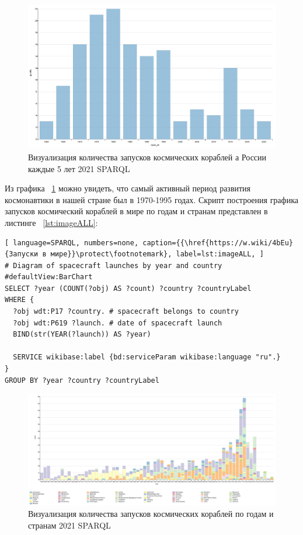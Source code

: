 \begin{figure}[h!]
  \includegraphics[width=\linewidth]{graphics/chapter/spacecraft_space_station/ImgRU.png}
  \caption[График Россия]{Визуализация количества запусков космических кораблей а России каждые 5 лет 2021 SPARQL}%
  \label{fig:ImageRU5}%
\end{figure}

Из графика ~\ref{fig:ImageRU5} можно увидеть, что самый активный период развития космонавтики в нашей стране был в 1970-1995 годах.
Скрипт построения графика запусков космический кораблей в мире по годам и странам представлен в листинге ~\ref{lst:imageALL}:
\begin{lstlisting}[ language=SPARQL, numbers=none, caption={{\href{https://w.wiki/4bEu}{Запуски в мире}}\protect\footnotemark}, label=lst:imageALL, ]
# Diagram of spacecraft launches by year and country
#defaultView:BarChart
SELECT ?year (COUNT(?obj) AS ?count) ?country ?countryLabel
WHERE {
  ?obj wdt:P17 ?country. # spacecraft belongs to country 
  ?obj wdt:P619 ?launch. # date of spacecraft launch
  BIND(str(YEAR(?launch)) AS ?year)
  
  SERVICE wikibase:label {bd:serviceParam wikibase:language "ru".}
}
GROUP BY ?year ?country ?countryLabel
\end{lstlisting}

\begin{figure}[h!]
  \includegraphics[width=\linewidth]{graphics/chapter/spacecraft_space_station/Visualization of the number of spacecraft launches by year and country 2021.png}
  \caption[График мир]{Визуализация количества запусков космических кораблей по годам и странам 2021 SPARQL}%
  \label{fig:ImgALL}%
\end{figure}

